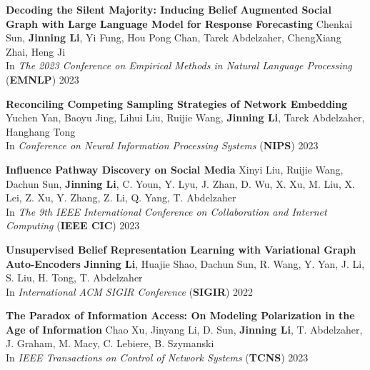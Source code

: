 \documentclass[12pt, letterpaper]{article}
\begin{document}
\textbf{Decoding the Silent Majority: Inducing Belief Augmented Social Graph with Large Language Model for Response Forecasting}
\href{https://aclanthology.org/2023.emnlp-main.4/}{}\href{https://github.com/chenkaisun/SocialSense}{}
\newline
\footnotesize
Chenkai Sun, \textbf{Jinning Li}, Yi Fung, Hou Pong Chan, Tarek Abdelzaher, ChengXiang Zhai, Heng Ji\\
In \emph{The 2023 Conference on Empirical Methods in Natural Language Processing} (\textbf{EMNLP}) 2023
\small
\vspace{2pt}

\textbf{Reconciling Competing Sampling Strategies of Network Embedding}
\href{https://papers.nips.cc/paper_files/paper/2023/hash/15dc2344ea9bdc01ffb8bb2d692e4018-Abstract-Conference.html}{}\href{https://github.com/yucheny5/SENSEI}{}
\newline
\footnotesize
Yuchen Yan, Baoyu Jing, Lihui Liu, Ruijie Wang, \textbf{Jinning Li}, Tarek Abdelzaher, Hanghang Tong\\
In \emph{Conference on Neural Information Processing Systems} (\textbf{NIPS}) 2023
\small
\vspace{2pt}

\textbf{Influence Pathway Discovery on Social Media}
\href{https://arxiv.org/abs/2309.16071}{}
\newline
\footnotesize
Xinyi Liu, Ruijie Wang, Dachun Sun, \textbf{Jinning Li}, C. Youn, Y. Lyu, J. Zhan, D. Wu, X. Xu, M. Liu,  X. Lei, Z. Xu, Y. Zhang, Z. Li, Q. Yang, T. Abdelzaher\\
In \emph{The 9th IEEE International Conference on Collaboration and Internet Computing} (\textbf{IEEE CIC}) 2023
\small
\vspace{2pt}

\textbf{Unsupervised Belief Representation Learning with Variational Graph Auto-Encoders}
\href{https://arxiv.org/abs/2110.00210}{}\href{https://github.com/happydeadline/InfoVGAE}{}\newline
\footnotesize
\textbf{Jinning Li}, Huajie Shao, Dachun Sun, R. Wang, Y. Yan, J. Li, S. Liu, H. Tong, T. Abdelzaher\\
In \emph{International ACM SIGIR Conference} (\textbf{SIGIR}) 2022
\small
\vspace{2pt}

\textbf{The Paradox of Information Access: On Modeling Polarization in the Age of Information}
\href{http://jinningli.cn/files/papers/tcns.pdf}{}
\newline
\footnotesize
Chao Xu, Jinyang Li, D. Sun, \textbf{Jinning Li}, T. Abdelzaher, J. Graham, M. Macy, C. Lebiere, B. Szymanski\\
In \emph{IEEE Transactions on Control of Network Systems} (\textbf{TCNS}) 2023
\small
\vspace{2pt}
\end{document}
